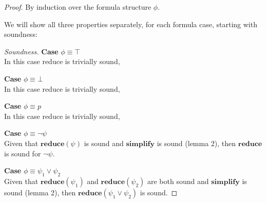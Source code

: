 \documentclass[10pt,a4paper]{article}
\begin{document}
\noindent \emph{Proof}. By induction over the formula structure $\phi$.

We will show all three properties separately, for each formula case, starting with soundness:

\begin{proof}[Soundness]

\noindent \textbf{Case} $\phi \equiv \top$ \\
In this case reduce is trivially sound, 

\noindent \textbf{Case} $\phi \equiv \bot$ \\
In this case reduce is trivially sound, 

\noindent \textbf{Case} $\phi \equiv p$ \\
In this case reduce is trivially sound, 

\noindent \textbf{Case} $\phi \equiv \neg \psi$ \\
Given that $\mathbf{reduce}(\psi)$ is sound and $\mathbf{simplify}$ is sound (lemma 2), then $\mathbf{reduce}$ is sound for $\neg \psi$.

\noindent \textbf{Case} $\phi \equiv \psi_1 \vee \psi_2$ \\
Given that $\mathbf{reduce}(\psi_1)$ and $\mathbf{reduce}(\psi_2)$ are both sound and $\mathbf{simplify}$ is sound (lemma 2), then $\mathbf{reduce}(\psi_1 \vee \psi_2)$ is sound.


\end{proof}
\end{document}
